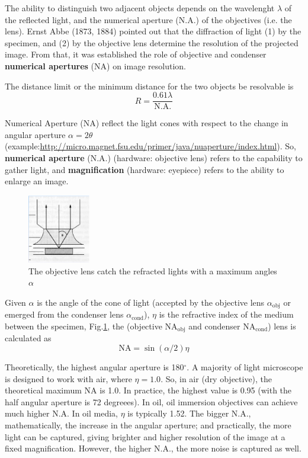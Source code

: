 The ability to distinguish two adjacent objects depends on the wavelenght
$\lambda$ of the reflected light, and the numerical aperture (N.A.) of the
objectives (i.e. the lens). Ernst Abbe (1873, 1884) pointed out that
the diffraction of light (1) by the specimen, and (2) by the objective lens
determine the resolution of the projected image. From that, it was established
the role of objective and condenser {\bf numerical apertures} (NA) on image
resolution. 

The distance limit or the minimum distance for the two objects be resolvable is
\begin{equation}
R = \frac{0.61 \lambda}{\text{N.A.}}
\end{equation}

Numerical Aperture (NA) reflect the light cones with respect to the change in 
angular aperture $\alpha=2\theta$
(example:\url{http://micro.magnet.fsu.edu/primer/java/nuaperture/index.html}).
So, {\bf numerical aperture} (N.A.) (hardware: objective lens) refers to the
capability to gather light, and {\bf magnification} (hardware: eyepiece) refers
to the ability to enlarge an image.

\begin{figure}[hbt]
  \centerline{\includegraphics[height=3cm,
    angle=0]{./images/NA_microscope.eps}}
  \caption{The objective lens catch the refracted lights with a maximum angles
  $\alpha$}
  \label{fig:NA_microscope}
\end{figure}

Given $\alpha$ is the angle of the cone of light (accepted by the objective lens
$\alpha_\text{obj}$ or emerged from the condenser lens $\alpha_\text{cond}$),
$\eta$ is the refractive index of the medium between the specimen,
Fig.\ref{fig:NA_microscope}, the (objective NA$_\text{obj}$ and condenser
NA$_\text{cond}$) lens is calculated as
\begin{equation}
\text{NA} = \sin (\alpha/2) \eta 
\end{equation}

Theoretically, the highest angular aperture is 180$^\circ$. A majority of light
microscope is designed to work with air, where $\eta = 1.0$.
So, in air (dry objective), the theoretical maximum NA is 1.0. In practice, the
highest value is 0.95 (with the half angular aperture is 72 degreees). In oil,
oil immersion objectives can achieve much higher N.A. In oil media,  $\eta$ is
typically 1.52. The bigger N.A., mathematically, the increase in the angular
aperture; and practically, the more light can be captured, giving brighter and
higher resolution of the image at a fixed magnification. However, the higher
N.A., the more noise is captured as well.

